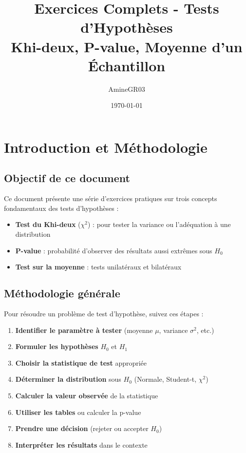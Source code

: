 \documentclass[11pt,a4paper]{article}
\title{Exercices Complets - Tests d'Hypothèses\\
\large Khi-deux, P-value, Moyenne d'un Échantillon}
\author{AmineGR03}
\date{\today}
\newcommand{\chideux}{\chi^2}
\begin{document}
\maketitle

\tableofcontents
\newpage

\section{Introduction et Méthodologie}

\subsection{Objectif de ce document}

Ce document présente une série d'exercices pratiques sur trois concepts fondamentaux des tests d'hypothèses :
\begin{itemize}
    \item \textbf{Test du Khi-deux} ($\chideux$) : pour tester la variance ou l'adéquation à une distribution
    \item \textbf{P-value} : probabilité d'observer des résultats aussi extrêmes sous $H_0$
    \item \textbf{Test sur la moyenne} : tests unilatéraux et bilatéraux
\end{itemize}

\subsection{Méthodologie générale}

Pour résoudre un problème de test d'hypothèse, suivez ces étapes :

\begin{enumerate}
    \item \textbf{Identifier le paramètre à tester} (moyenne $\mu$, variance $\sigma^2$, etc.)
    \item \textbf{Formuler les hypothèses} $H_0$ et $H_1$
    \item \textbf{Choisir la statistique de test} appropriée
    \item \textbf{Déterminer la distribution} sous $H_0$ (Normale, Student-t, $\chideux$)
    \item \textbf{Calculer la valeur observée} de la statistique
    \item \textbf{Utiliser les tables} ou calculer la p-value
    \item \textbf{Prendre une décision} (rejeter ou accepter $H_0$)
    \item \textbf{Interpréter les résultats} dans le contexte
\end{enumerate}
\end{document}
